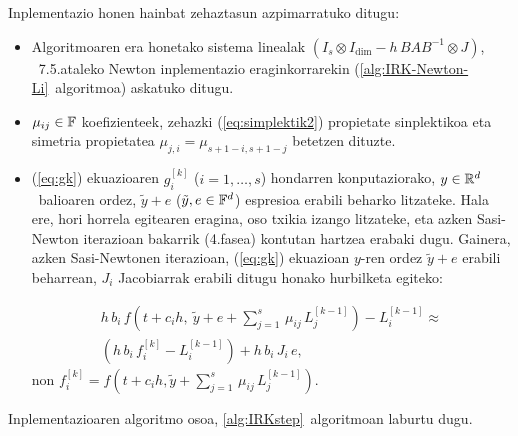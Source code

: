 
 
Inplementazio honen hainbat zehaztasun azpimarratuko ditugu:
\begin{itemize}

\item Algoritmoaren era honetako sistema linealak $(I_s \otimes I_\dim  - h \, B A B^{-1} \otimes J )$, ~7.5.ataleko Newton inplementazio eraginkorrarekin  (\ref{alg:IRK-Newton-Li}~algoritmoa) askatuko ditugu.

\item $\mu_{i j} \in \mathbb{F}$ koefizienteek, zehazki (\ref{eq:simplektik2}) propietate sinplektikoa  eta simetria propietatea $\mu_{j, i} = \mu_{s+1-i,s+1-j}$  betetzen dituzte.

\item (\ref{eq:gk}) ekuazioaren $g_i^{[k]}$  ($i=1,\dots,s$) hondarren  konputaziorako, $y\in \mathbb{R}^d$~balioaren ordez, $\tilde y + e$ ($\tilde y, e \in \mathbb{F}^d$) espresioa erabili beharko litzateke. Hala ere, hori horrela egitearen eragina, oso txikia izango litzateke, eta azken Sasi-Newton iterazioan  bakarrik (4.fasea) kontutan hartzea erabaki dugu.  Gainera, azken Sasi-Newtonen iterazioan, (\ref{eq:gk}) ekuazioan $y$-ren ordez $\tilde{y}+e$ erabili beharrean, $J_i$ Jacobiarrak erabili ditugu honako hurbilketa egiteko:

\begin{gather*}
 h \, b_i\, f\left(t+c_i h, \ \tilde y + e +\sum_{j=1}^{s}\, \mu_{ij}\, L_{j}^{[k-1]}\right)  -L_{i}^{[k-1]} \approx \\
\left(h \, b_i\, f_i^{[k]} -L_{i}^{[k-1]} \right) + h\, b_i \, J_i \, e,
\end{gather*}
%
non $f_i^{[k]}=f\left(t+c_i h,  \tilde y +\sum_{j=1}^{s}\, \mu_{ij}\, L_{j}^{[k-1]}\right)$.

\end{itemize}

Inplementazioaren algoritmo osoa, \ref{alg:IRKstep}~algoritmoan laburtu dugu. 

